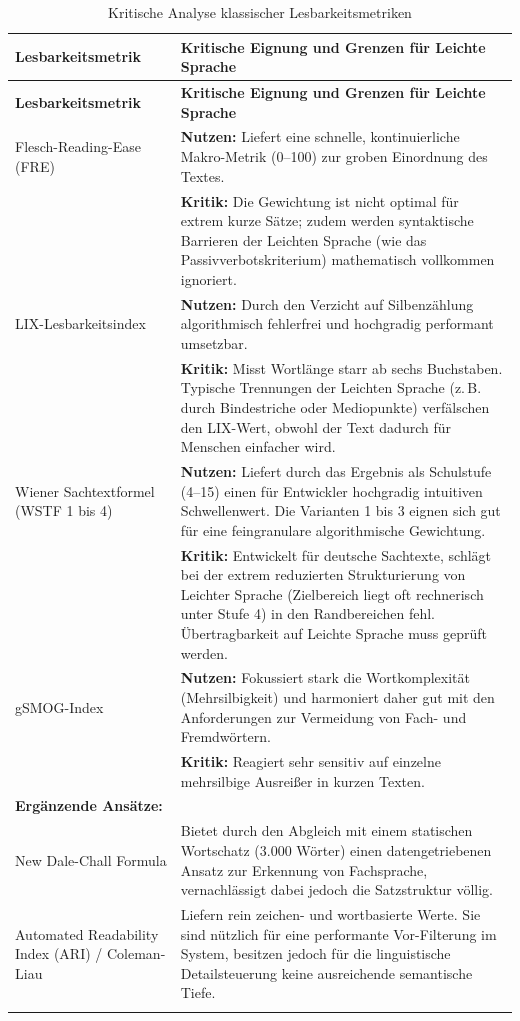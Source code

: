 \begin{longtable}{|p{}|p{}|}
	\hline
	\textbf{Lesbarkeitsmetrik} & \textbf{Kritische Eignung und Grenzen für Leichte Sprache}\\
	\hline
	\endfirsthead
	
	\hline
	\textbf{Lesbarkeitsmetrik} & \textbf{Kritische Eignung und Grenzen für Leichte Sprache}\\
	\hline
	\endhead
	
	Flesch-Reading-Ease (FRE) & 
	\textbf{Nutzen:} Liefert eine schnelle, kontinuierliche Makro-Metrik (0--100) zur groben Einordnung des Textes. \\
	& \textbf{Kritik:} Die Gewichtung ist nicht optimal für extrem kurze Sätze; zudem werden syntaktische Barrieren der Leichten Sprache (wie das Passivverbotskriterium) mathematisch vollkommen ignoriert.\\
	\hline
	
	LIX-Lesbarkeitsindex & 
	\textbf{Nutzen:} Durch den Verzicht auf Silbenzählung algorithmisch fehlerfrei und hochgradig performant umsetzbar. \\
	& \textbf{Kritik:} Misst Wortlänge starr ab sechs Buchstaben. Typische Trennungen der Leichten Sprache (z.\,B. durch Bindestriche oder Mediopunkte) verfälschen den LIX-Wert, obwohl der Text dadurch für Menschen einfacher wird.\\
	\hline
	
	Wiener Sachtextformel (WSTF 1 bis 4) & 
	\textbf{Nutzen:} Liefert durch das Ergebnis als Schulstufe (4--15) einen für Entwickler hochgradig intuitiven Schwellenwert. Die Varianten 1 bis 3 eignen sich gut für eine feingranulare algorithmische Gewichtung. \\
	& \textbf{Kritik:} Entwickelt für deutsche Sachtexte, schlägt bei der extrem reduzierten Strukturierung von Leichter Sprache (Zielbereich liegt oft rechnerisch unter Stufe 4) in den Randbereichen fehl. Übertragbarkeit auf Leichte Sprache muss geprüft werden.\\
	\hline
	
	gSMOG-Index & 
	\textbf{Nutzen:} Fokussiert stark die Wortkomplexität (Mehrsilbigkeit) und harmoniert daher gut mit den Anforderungen zur Vermeidung von Fach- und Fremdwörtern. \\
	& \textbf{Kritik:} Reagiert sehr sensitiv auf einzelne mehrsilbige Ausreißer in kurzen Texten.\\
	\hline
	
	\textbf{Ergänzende Ansätze:} & \\
	New Dale-Chall Formula & Bietet durch den Abgleich mit einem statischen Wortschatz (3.000 Wörter) einen datengetriebenen Ansatz zur Erkennung von Fachsprache, vernachlässigt dabei jedoch die Satzstruktur völlig.\\
	Automated Readability Index (ARI) / Coleman-Liau & Liefern rein zeichen- und wortbasierte Werte. Sie sind nützlich für eine performante Vor-Filterung im System, besitzen jedoch für die linguistische Detailsteuerung keine ausreichende semantische Tiefe.\\
	\hline
	\caption{Kritische Analyse klassischer Lesbarkeitsmetriken}
\end{longtable}

